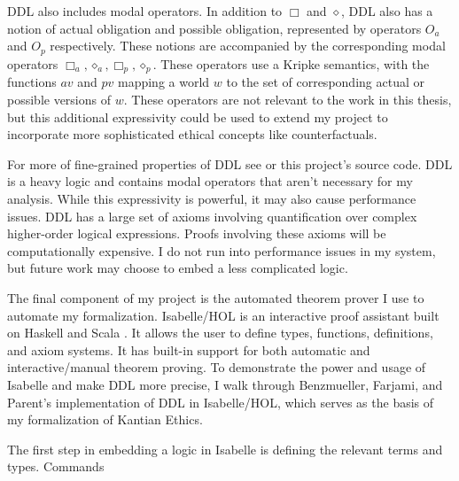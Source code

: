 \begin{isabellebody}
\begin{isamarkuptext}
DDL also includes modal operators. In addition to $\Box$ and $\diamond$, DDL also has a notion
of actual obligation and possible obligation, represented by operators $O_a$ and $O_p$ respectively. 
These notions are accompanied by the corresponding modal operators $\Box_a, \diamond_a, \Box_p, \diamond_p$. 
These operators use a Kripke semantics, with the functions $av$ and $pv$ mapping a world $w$ to the set 
of corresponding actual or possible versions of $w$. These operators are not relevant to the work in 
this thesis, but this additional expressivity could be used to extend my project to incorporate 
more sophisticated ethical concepts like counterfactuals.

For more of fine-grained properties of DDL see \citet{CJDDL} or this project's source code. DDL is a heavy logic and contains modal operators 
that aren't necessary for my analysis. While this expressivity is powerful, it may also cause performance
issues. DDL has a large set of axioms involving quantification over complex higher-order
logical expressions. Proofs involving these axioms will be computationally expensive. I do not run 
into performance issues in my system, but future work may choose to embed a less complicated logic.%
\end{isamarkuptext}\isamarkuptrue%
%
\isadelimdocument
%
\endisadelimdocument
%
\isatagdocument
%
\isamarkuptrue%
%
\endisatagdocument
{\isafolddocument}%
%
\isadelimdocument
%
\endisadelimdocument
%
\begin{isamarkuptext}%
The final component of my project is the automated theorem prover I use to automate my formalization.
Isabelle/HOL is an interactive proof assistant built on Haskell and Scala \citep{isabelle}. It 
allows the user to define types, functions, definitions, and axiom systems. It has built-in support for both
automatic and interactive/manual theorem proving. To demonstrate the power and usage of Isabelle and 
make DDL more precise, I walk through Benzmueller, Farjami, and Parent's implementation of DDL in Isabelle/HOL, 
which serves as the basis of my formalization of Kantian Ethics.%
\end{isamarkuptext}\isamarkuptrue%
%
\isadelimdocument
%
\endisadelimdocument
%
\isatagdocument
%
\isamarkuptrue%
%
\endisatagdocument
{\isafolddocument}%
%
\isadelimdocument
%
\endisadelimdocument
%
\begin{isamarkuptext}%
The first step in embedding a logic in Isabelle is defining the relevant terms and types. Commands

\end{isamarkuptext}
\end{isabellebody}
